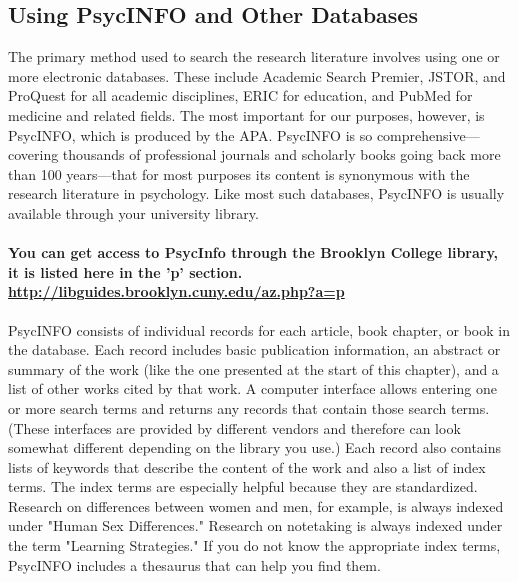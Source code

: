\subsection{Using PsycINFO and Other Databases}
The primary method used to search the research literature involves using one or more electronic databases. These include Academic Search Premier, JSTOR, and ProQuest for all academic disciplines, ERIC for education, and PubMed for medicine and related fields. The most important for our purposes, however, is PsycINFO, which is produced by the APA. PsycINFO is so comprehensive---covering thousands of professional journals and scholarly books going back more than 100 years---that for most purposes its content is synonymous with the research literature in psychology. Like most such databases, PsycINFO is usually available through your university library.

\paragraph{You can get access to PsycInfo through the Brooklyn College library, it is listed here in the 'p' section. \url{http://libguides.brooklyn.cuny.edu/az.php?a=p}}

PsycINFO consists of individual records for each article, book chapter, or book in the database. Each record includes basic publication information, an abstract or summary of the work (like the one presented at the start of this chapter), and a list of other works cited by that work. A computer interface allows entering one or more search terms and returns any records that contain those search terms. (These interfaces are provided by different vendors and therefore can look somewhat different depending on the library you use.) Each record also contains lists of keywords that describe the content of the work and also a list of index terms. The index terms are especially helpful because they are standardized. Research on differences between women and men, for example, is always indexed under "Human Sex Differences." Research on notetaking is always indexed under the term "Learning Strategies." If you do not know the appropriate index terms, PsycINFO includes a thesaurus that can help you find them.


